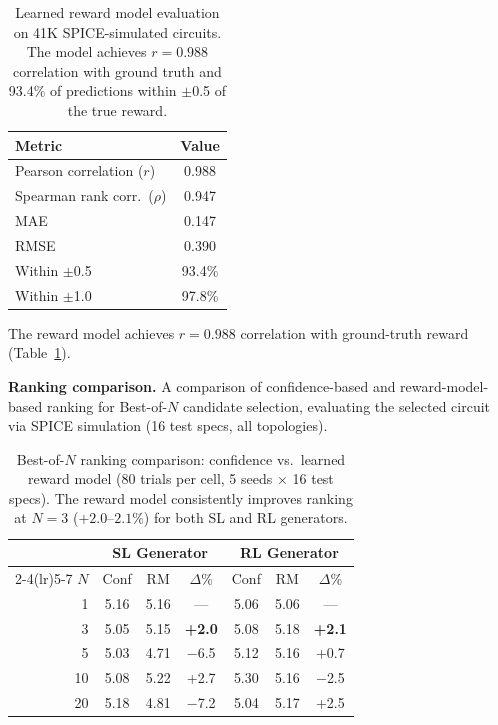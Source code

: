 \documentclass[conference]{IEEEtran}
\begin{document}
\begin{table}[t]
\centering
\caption{Learned reward model evaluation on 41K SPICE-simulated
circuits. The model achieves $r\!=\!0.988$ correlation with ground
truth and 93.4\% of predictions within $\pm$0.5 of the true reward.}
\label{tab:reward-model}
\begin{tabular}{@{}lc@{}}
\toprule
Metric & Value \\\midrule
Pearson correlation ($r$) & 0.988 \\
Spearman rank corr.\ ($\rho$) & 0.947 \\
MAE & 0.147 \\
RMSE & 0.390 \\
Within $\pm$0.5 & 93.4\% \\
Within $\pm$1.0 & 97.8\% \\
\bottomrule
\end{tabular}
\end{table}

The reward model achieves $r\!=\!0.988$ correlation with ground-truth
reward (Table~\ref{tab:reward-model}).

\textbf{Ranking comparison.} A comparison of confidence-based and
reward-model-based ranking for Best-of-$N$ candidate selection,
evaluating the selected circuit via SPICE simulation (16 test
specs, all topologies).

\begin{table}[t]
\centering
\caption{Best-of-$N$ ranking comparison: confidence vs.\ learned reward
model (80 trials per cell, 5 seeds $\times$ 16 test specs).
The reward model consistently improves ranking at $N\!=\!3$
($+2.0$--$2.1\%$) for both SL and RL generators.}
\label{tab:ranking-compare}
\begin{tabular}{@{}r ccc ccc@{}}
\toprule
     & \multicolumn{3}{c}{\textbf{SL Generator}}
     & \multicolumn{3}{c}{\textbf{RL Generator}} \\
\cmidrule(lr){2-4}\cmidrule(lr){5-7}
$N$  & Conf & RM & $\Delta$\%
     & Conf & RM & $\Delta$\% \\\midrule
1    & 5.16 & 5.16 & ---
     & 5.06 & 5.06 & --- \\
3    & 5.05 & 5.15 & \textbf{+2.0}
     & 5.08 & 5.18 & \textbf{+2.1} \\
5    & 5.03 & 4.71 & $-$6.5
     & 5.12 & 5.16 & +0.7 \\
10   & 5.08 & 5.22 & +2.7
     & 5.30 & 5.16 & $-$2.5 \\
20   & 5.18 & 4.81 & $-$7.2
     & 5.04 & 5.17 & +2.5 \\
\bottomrule
\end{tabular}
\end{table}
\end{document}

